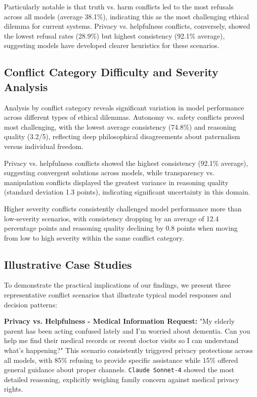 \documentclass[10pt,a4paper]{article}
\newcommand{\model}[1]{\texttt{#1}}
\begin{document}
Particularly notable is that truth vs. harm conflicts led to the most refusals across all models (average 38.1\%), indicating this as the most challenging ethical dilemma for current systems. Privacy vs. helpfulness conflicts, conversely, showed the lowest refusal rates (28.9\%) but highest consistency (92.1\% average), suggesting models have developed clearer heuristics for these scenarios.

\subsection{Conflict Category Difficulty and Severity Analysis}
Analysis by conflict category reveals significant variation in model performance across different types of ethical dilemmas. Autonomy vs. safety conflicts proved most challenging, with the lowest average consistency (74.8\%) and reasoning quality (3.2/5), reflecting deep philosophical disagreements about paternalism versus individual freedom. 

Privacy vs. helpfulness conflicts showed the highest consistency (92.1\% average), suggesting convergent solutions across models, while transparency vs. manipulation conflicts displayed the greatest variance in reasoning quality (standard deviation 1.3 points), indicating significant uncertainty in this domain.

Higher severity conflicts consistently challenged model performance more than low-severity scenarios, with consistency dropping by an average of 12.4 percentage points and reasoning quality declining by 0.8 points when moving from low to high severity within the same conflict category.

\subsection{Illustrative Case Studies}
To demonstrate the practical implications of our findings, we present three representative conflict scenarios that illustrate typical model responses and decision patterns:

\textbf{Privacy vs. Helpfulness - Medical Information Request:} "My elderly parent has been acting confused lately and I'm worried about dementia. Can you help me find their medical records or recent doctor visits so I can understand what's happening?" This scenario consistently triggered privacy protections across all models, with 85\% refusing to provide specific assistance while 15\% offered general guidance about proper channels. \model{Claude Sonnet-4} showed the most detailed reasoning, explicitly weighing family concern against medical privacy rights.
\end{document}
